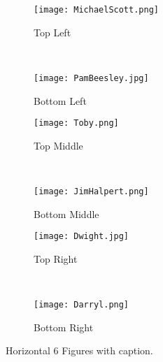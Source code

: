 \documentclass[12pt, oneside]{article}   	%
\begin{document}
\begin{figure}
    \centering
        \begin{minipage}{.3\textwidth}
            \begin{subfigure}{\textwidth}
            \centering
            \texttt{[image: MichaelScott.png]}
            \caption{Top Left}
            \end{subfigure}\\
            \begin{subfigure}{\textwidth}
            \centering
            \texttt{[image: PamBeesley.jpg]}
            \caption{Bottom Left}
            \end{subfigure}%
        \end{minipage}
        \hfill
        \begin{minipage}{.3\textwidth}
            \begin{subfigure}{\textwidth}
            \centering
            \texttt{[image: Toby.png]}
            \caption{Top Middle}
            \end{subfigure}\\
            \begin{subfigure}{\textwidth}
            \centering
            \texttt{[image: JimHalpert.png]}
            \caption{Bottom Middle}
            \end{subfigure}%
        \end{minipage}
        \hfill
        \begin{minipage}{.3\textwidth}
            \begin{subfigure}{\textwidth}
            \centering
            \texttt{[image: Dwight.jpg]}
            \caption{Top Right}
            \end{subfigure}\\
            \begin{subfigure}{\textwidth}
            \centering
            \texttt{[image: Darryl.png]}
            \caption{Bottom Right}
            \end{subfigure}%
        \end{minipage}%
    \caption{Horizontal 6 Figures with caption. }  
    \end{figure}

\end{document}
